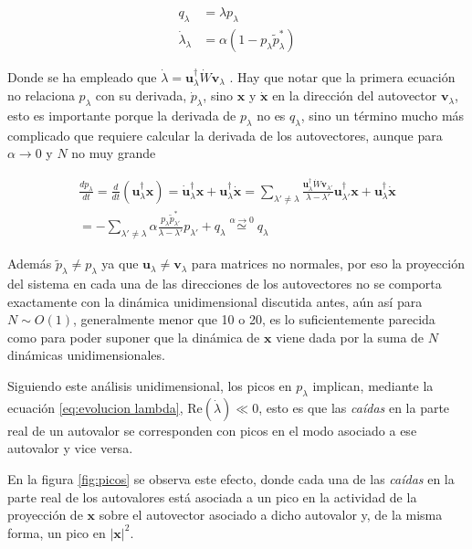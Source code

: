 \documentclass[11pt,a4paper,twoside,pdf]{article}
\numberwithin{equation}{section}
\newcommand{\re}{\text{Re}}
\begin{document}
\begin{align}
  q_\lambda &= \lambda p_\lambda\\
  \dot{\lambda}_\lambda &= \alpha(1-p_\lambda\tilde{p}_\lambda^*) \label{eq:evolucion lambda}
\end{align}

Donde se ha empleado que \(\dot{\lambda} = \mathbf{u}_\lambda^\dagger \dot{W}\mathbf{v}_\lambda\) \parencite{greenbaum2020}. Hay que notar que la primera ecuación no relaciona \(p_\lambda\) con su derivada, \(\dot{p}_\lambda\), sino \(\mathbf{x}\) y \(\dot{\mathbf{x}}\) en la dirección del autovector \(\mathbf{v}_\lambda\), esto es importante porque la derivada de \(p_\lambda\) no es \(q_\lambda\), sino un término mucho más complicado que requiere calcular la derivada de los autovectores, aunque para \(\alpha \rightarrow 0\) y \(N\) no muy grande

\begin{multline}
  \frac{dp_\lambda}{dt} = \frac{d}{dt}(\mathbf{u}_\lambda^\dagger \mathbf{x}) = \dot{\mathbf{u}}_\lambda^\dagger \mathbf{x} + \mathbf{u}_\lambda^\dagger \dot{\mathbf{x}} = \sum_{\lambda'\neq \lambda}\frac{\mathbf{u}_\lambda^\dagger \dot{W}\mathbf{v}_{\lambda'}}{\lambda - \lambda'}\mathbf{u}_{\lambda'}^\dagger \mathbf{x} + \mathbf{u}_\lambda^\dagger \dot{\mathbf{x}}\\
   = -\sum_{\lambda'\neq \lambda}\alpha \frac{p_\lambda \tilde{p}_{\lambda'}^*}{\lambda - \lambda'}p_{\lambda'} + q_\lambda \stackrel{\alpha \rightarrow 0}{\simeq} q_\lambda
\end{multline}

Además \(\tilde{p}_\lambda \neq p_\lambda\) ya que \(\mathbf{u}_\lambda \neq \mathbf{v}_\lambda\) para matrices no normales, por eso la proyección del sistema en cada una de las direcciones de los autovectores no se comporta exactamente con la dinámica unidimensional discutida antes, aún así para \(N \sim O(1)\), generalmente menor que 10 o 20, es lo suficientemente parecida como para poder suponer que la dinámica de \(\mathbf{x}\) viene dada por la suma de \(N\) dinámicas unidimensionales.

Siguiendo este análisis unidimensional, los picos en \(p_\lambda\) implican, mediante la ecuación \ref{eq:evolucion lambda}, \(\re(\dot{\lambda}) \ll 0\), esto es que las \emph{caídas} en la parte real de un autovalor se corresponden con picos en el modo asociado a ese autovalor y vice versa.

En la figura \ref{fig:picos} se observa este efecto, donde cada una de las \emph{caídas} en la parte real de los autovalores está asociada a un pico en la actividad de la proyección de \(\mathbf{x}\) sobre el autovector asociado a dicho autovalor y, de la misma forma, un pico en \(|\mathbf{x}|^2\).
\end{document}
